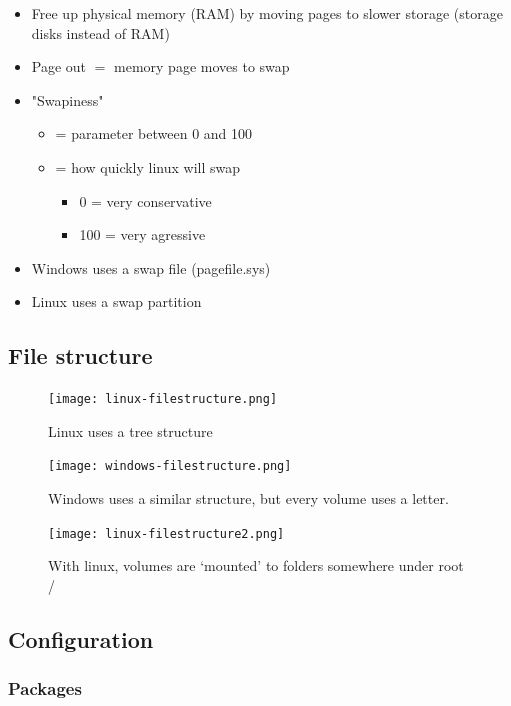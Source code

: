 \documentclass{article}
\begin{document}
\begin{itemize}
    \item Free up physical memory (RAM) by moving pages to slower storage (storage disks instead of RAM)
    \item Page out $=$ memory page moves to swap
    \item "Swapiness"
    \begin{itemize}
        \item = parameter between 0 and 100
        \item = how quickly linux will swap
        \begin{itemize}
            \item 0 = very conservative
            \item 100 = very agressive
        \end{itemize}
    \end{itemize}
    \item Windows uses a swap file (pagefile.sys)
    \item Linux uses a swap partition
\end{itemize}

\subsection{File structure}



\begin{figure}[H]
    \centering
    \texttt{[image: linux-filestructure.png]}
    \caption{Linux uses a tree structure}
\end{figure}

\begin{figure}[H]
    \centering
    \texttt{[image: windows-filestructure.png]}
    \caption{Windows uses a similar structure, but every volume uses a letter.}
\end{figure}

\begin{figure}[H]
    \centering
    \texttt{[image: linux-filestructure2.png]}
    \caption{With linux, volumes are `mounted' to folders somewhere under root /}
\end{figure}

\subsection{Configuration}

\subsubsection{Packages}
\end{document}
